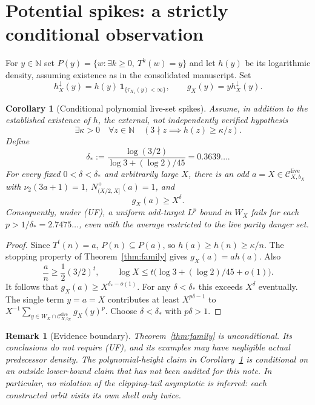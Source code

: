 \documentclass[11pt,a4paper]{article}
\newtheorem{corollary}[theorem]{Corollary}
\newtheorem{remark}[theorem]{Remark}
\newcommand{\N}{\mathbb N}
\newcommand{\one}{\mathbf 1}
\newcommand{\calC}{\mathcal C}
\begin{document}
\section{Potential spikes: a strictly conditional observation}
For $y\in\N$ set $P(y)=\{w:\exists k\ge0,\ T^k(w)=y\}$ and let
$h(y)$ be its logarithmic density, assuming existence as in the
consolidated manuscript. Set
\[
 h_X^\downarrow(y)=h(y)\,\one_{\{\tau_{X_1}(y)<\infty\}},
 \qquad g_X(y)=y h_X^\downarrow(y).
\]
\begin{corollary}[Conditional polynomial live-set spikes]\label{cor:UF}
Assume, in addition to the established existence of $h$, the
\emph{external, not independently verified} hypothesis
\[
 \tag{UF}\label{eq:UF}
 \exists\kappa>0\quad\forall z\in\N\quad
 (3\nmid z\implies h(z)\ge\kappa/z).
\]
Define
\[
 \delta_*:=\frac{\log(3/2)}{\log3+(\log2)/45}=0.3639\ldots.
\]
For every fixed $0<\delta<\delta_*$ and arbitrarily large
$X$, there is an odd $a=X\in\calC^{\mathrm{live}}_{X,b_X}$
with $\nu_2(3a+1)=1$, $N_{(X/2,X]}^+(a)=1$, and
\[
 \boxed{\quad g_X(a)\ge X^\delta.\quad}
\]
Consequently, under (UF), a uniform odd-target $L^p$ bound in
$W_X$ fails for each $p>1/\delta_*=2.7475\ldots$, even with
the average restricted to the live parity danger set.
\end{corollary}
\begin{proof}
Since $T^t(n)=a$, $P(n)\subseteq P(a)$, so
$h(a)\ge h(n)\ge\kappa/n$. The stopping property of
Theorem~\ref{thm:family} gives $g_X(a)=ah(a)$. Also
\[
 \frac an\ge\frac12(3/2)^t,
 \qquad
 \log X\le t\bigl(\log3+(\log2)/45+o(1)\bigr).
\]
It follows that $g_X(a)\ge X^{\delta_*-o(1)}$.
For any $\delta<\delta_*$ this exceeds $X^\delta$ eventually.
The single term $y=a=X$ contributes at least $X^{p\delta-1}$ to
$X^{-1}\sum_{y\in W_X\cap\calC^{\mathrm{live}}_{X,b_X}}g_X(y)^p$.
Choose $\delta<\delta_*$ with $p\delta>1$.
\end{proof}
\begin{remark}[Evidence boundary]
Theorem~\ref{thm:family} is unconditional. Its conclusions do
\emph{not} require (UF), and its examples may have negligible
actual predecessor density. The polynomial-height claim in
Corollary~\ref{cor:UF} is conditional on an outside lower-bound
claim that has not been audited for this note. In particular,
no violation of the clipping-tail asymptotic is inferred: each
constructed orbit visits its own shell only twice.
\end{remark}
\end{document}
